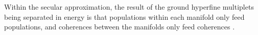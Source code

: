 \documentclass[preprint,aps,pra,onecolumn]{revtex4-1} %
\begin{document}
\begin{appendix}
{Within the secular approximation, the result of the ground hyperfine multiplets being separated in energy is that populations within each manifold only feed populations, and coherences between the manifolds only feed coherences \cite{deutsch_quantum_2010}.  
}

\end{appendix}
\end{document}
